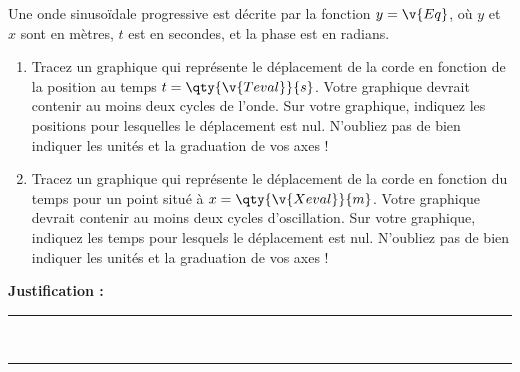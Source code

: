Une onde sinusoïdale progressive est décrite par la fonction $y = \v{Eq}$, où $y$ et $x$ sont en mètres, $t$ est en secondes, et la phase est en radians.

\begin{enumerate}[label=\alph*)]
    \item Tracez un graphique qui représente le déplacement de la corde en fonction de la position au temps $t = \qty{\v{Teval}}{s}$. Votre graphique devrait contenir au moins deux cycles de l'onde. Sur votre graphique, indiquez les positions pour lesquelles le déplacement est nul. N'oubliez pas de bien indiquer les unités et la graduation de vos axes !
    \item Tracez un graphique qui représente le déplacement de la corde en fonction du temps pour un point situé à $x = \qty{\v{Xeval}}{m}$. Votre graphique devrait contenir au moins deux cycles d'oscillation. Sur votre graphique, indiquez les temps pour lesquels le déplacement est nul. N'oubliez pas de bien indiquer les unités et la graduation de vos axes !
\end{enumerate}

\noindent\textbf{Justification :} \hrulefill \\[2.5ex]
\rule{\linewidth}{0.4pt} \\[2.5ex]
\rule{\linewidth}{0.4pt}
\vfill